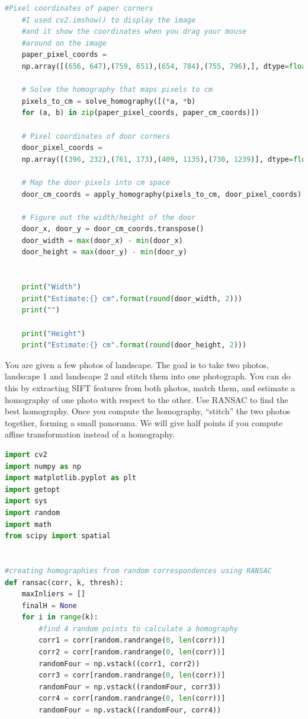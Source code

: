 \documentclass{exam}
\begin{document}
\begin{questions}
\begin{lstlisting}[language=python, frame=single]
    #Pixel coordinates of paper corners
    #I used cv2.imshow() to display the image
    #and it show the coordinates when you drag your mouse
    #around on the image
    paper_pixel_coords = 
    np.array([(656, 647),(759, 651),(654, 784),(755, 796),], dtype=float)

    # Solve the homography that maps pixels to cm
    pixels_to_cm = solve_homography([(*a, *b) 
    for (a, b) in zip(paper_pixel_coords, paper_cm_coords)])

    # Pixel coordinates of door corners
    door_pixel_coords = 
    np.array([(396, 232),(761, 173),(409, 1135),(730, 1239)], dtype=float)

    # Map the door pixels into cm space
    door_cm_coords = apply_homography(pixels_to_cm, door_pixel_coords)

    # Figure out the width/height of the door
    door_x, door_y = door_cm_coords.transpose()
    door_width = max(door_x) - min(door_x)
    door_height = max(door_y) - min(door_y)
    

    print("Width")
    print("Estimate:{} cm".format(round(door_width, 2)))
    print("")

    print("Height")
    print("Estimate:{} cm".format(round(door_height, 2)))

\end{lstlisting}



\question You are given a few photos of landscape. The goal is to take two photos, landscape 1 and landscape 2 and stitch them into one photograph. You can do this by extracting SIFT features from both photos, match them, and estimate a homography of one photo with respect to the other. Use RANSAC to find the best homography. Once you compute the homography, “stitch” the two photos together, forming a small panorama. We will give half points if you compute affine transformation instead of a homography.

\begin{lstlisting}[language=python, frame=single]
import cv2
import numpy as np
import matplotlib.pyplot as plt
import getopt
import sys
import random
import math
from scipy import spatial


#creating homographies from random correspondences using RANSAC
def ransac(corr, k, thresh):
    maxInliers = []
    finalH = None
    for i in range(k):
        #find 4 random points to calculate a homography
        corr1 = corr[random.randrange(0, len(corr))]
        corr2 = corr[random.randrange(0, len(corr))]
        randomFour = np.vstack((corr1, corr2))
        corr3 = corr[random.randrange(0, len(corr))]
        randomFour = np.vstack((randomFour, corr3))
        corr4 = corr[random.randrange(0, len(corr))]
        randomFour = np.vstack((randomFour, corr4))


\end{lstlisting}
\end{questions}
\end{document}
